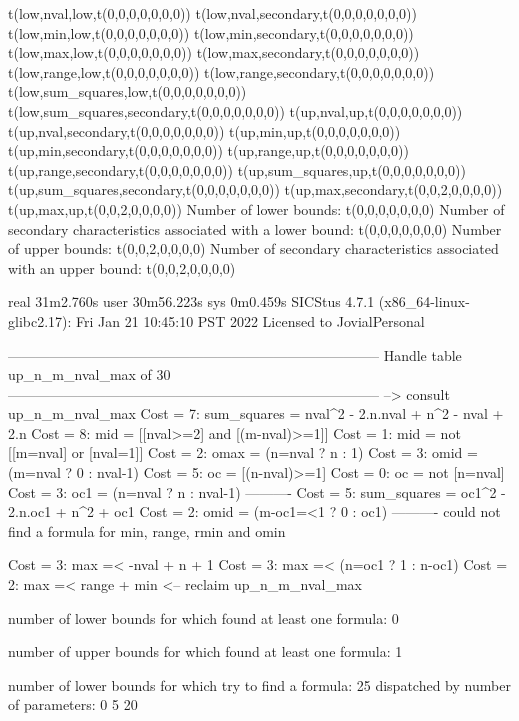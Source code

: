 t(low,nval,low,t(0,0,0,0,0,0,0))
t(low,nval,secondary,t(0,0,0,0,0,0,0))
t(low,min,low,t(0,0,0,0,0,0,0))
t(low,min,secondary,t(0,0,0,0,0,0,0))
t(low,max,low,t(0,0,0,0,0,0,0))
t(low,max,secondary,t(0,0,0,0,0,0,0))
t(low,range,low,t(0,0,0,0,0,0,0))
t(low,range,secondary,t(0,0,0,0,0,0,0))
t(low,sum_squares,low,t(0,0,0,0,0,0,0))
t(low,sum_squares,secondary,t(0,0,0,0,0,0,0))
t(up,nval,up,t(0,0,0,0,0,0,0))
t(up,nval,secondary,t(0,0,0,0,0,0,0))
t(up,min,up,t(0,0,0,0,0,0,0))
t(up,min,secondary,t(0,0,0,0,0,0,0))
t(up,range,up,t(0,0,0,0,0,0,0))
t(up,range,secondary,t(0,0,0,0,0,0,0))
t(up,sum_squares,up,t(0,0,0,0,0,0,0))
t(up,sum_squares,secondary,t(0,0,0,0,0,0,0))
t(up,max,secondary,t(0,0,2,0,0,0,0))
t(up,max,up,t(0,0,2,0,0,0,0))
Number of lower bounds:                                             t(0,0,0,0,0,0,0)
Number of secondary characteristics associated with a lower bound:  t(0,0,0,0,0,0,0)
Number of upper bounds:                                             t(0,0,2,0,0,0,0)
Number of secondary characteristics associated with an upper bound: t(0,0,2,0,0,0,0)

real	31m2.760s
user	30m56.223s
sys	0m0.459s
SICStus 4.7.1 (x86_64-linux-glibc2.17): Fri Jan 21 10:45:10 PST 2022
Licensed to JovialPersonal


--------------------------------------------------------------------------------
Handle table up_n_m_nval_max of 30
--------------------------------------------------------------------------------
--> consult up_n_m_nval_max
Cost =  7:  sum_squares = nval^2 - 2.n.nval + n^2 - nval + 2.n
Cost =  8:  mid         = [[nval>=2] and [(m-nval)>=1]]
Cost =  1:  mid         = not [[m=nval] or [nval=1]]
Cost =  2:  omax        = (n=nval ? n : 1)
Cost =  3:  omid        = (m=nval ? 0 : nval-1)
Cost =  5:  oc          = [(n-nval)>=1]
Cost =  0:  oc          = not [n=nval]
Cost =  3:  oc1         = (n=nval ? n : nval-1)
----------
Cost =  5:  sum_squares = oc1^2 - 2.n.oc1 + n^2 + oc1
Cost =  2:  omid        = (m-oc1=<1 ? 0 : oc1)
----------
could not find a formula for min, range, rmin and omin

Cost =  3:  max =< -nval + n + 1
Cost =  3:  max =< (n=oc1 ? 1 : n-oc1)
Cost =  2:  max =< range + min
<-- reclaim up_n_m_nval_max

number of lower bounds for which found at least one formula: 0

number of upper bounds for which found at least one formula: 1

number of lower bounds for which try to find a formula: 25
dispatched by number of parameters: 0  5  20

